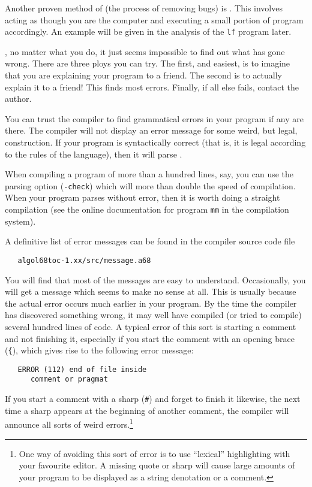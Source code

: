 Another proven method of  (the process of removing
bugs) is .  This involves acting as though you are
the computer and executing a small portion of program accordingly. An
example will be given in the analysis of the \verb|lf| program later.

, no matter what you do, it just seems
impossible to find out what has gone wrong.  There are three ploys you can
try.  The first, and easiest, is to imagine that you are explaining your
program to a friend.  The second is to actually explain it to a friend!
This finds most errors.  Finally, if all else fails, contact the
author.

You can trust the compiler to find grammatical errors in your program
if any are there. The compiler will not display an error message for
some weird, but legal, construction. If your program is syntactically
correct (that is, it is legal according to the rules of the
language), then it will parse .

When compiling a program of more than a hundred lines, say, you can use
the parsing option (\verb|-check|) which will more than double the
speed of compilation. When your program parses without error, then it
is worth doing a straight compilation (see the online documentation for
program \verb|mm| in the  compilation system).

A definitive list of error messages can be found in the compiler source code file
\begin{verbatim}
   algol68toc-1.xx/src/message.a68
\end{verbatim}
\noindent
You will find that most of the messages are easy to understand.
Occasionally, you will get a message which seems to make no sense at
all. This is usually because the actual error occurs much earlier in
your program. By the time the compiler has discovered something
wrong, it may well have compiled (or tried to compile) several
hundred lines of code. A typical error of this sort is starting a
comment and not finishing it, especially if you start the comment
with an opening brace (\verb|{|), which gives rise to the following
error message:
\begin{verbatim}
   ERROR (112) end of file inside
      comment or pragmat
\end{verbatim}
\noindent
If you start a comment with a sharp (\verb|#|) and forget to finish it
likewise, the next time a sharp appears at the beginning of another
comment, the compiler will announce all sorts of weird
errors.\footnote{One way of avoiding this sort of error is to use
``lexical'' highlighting with your favourite editor. A missing quote
or sharp will cause large amounts of your program to be displayed as
a string denotation or a comment.}

